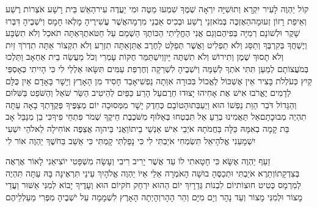 \documentclass[../main/main.tex]{subfiles}
\begin{document}
\begin{multicols*}{\ncols}
קוֹל יַהְוֶה לָעִיר יִקְרָא וְתוּשִׁיָּה יִרְאָה\SubEnd{} שְׁמֶךָ שִׁמְעוּ מַטֶּה וּמִי יַעֲדֶה עִיר\SubEnd{}\PreVerseSpace{}הַאֵשׁ\SubEnd{} בֵּית רָשָׁע אֹצְרוֹת רֶשַׁע וְאֵיפַת רָזוֹן זְעוּמָה\PreVerseSpace{}הַאֶזְכֶּה בְּמֹאזְנֵי רֶשַׁע וּבְכִיס אַבְנֵי מִרְמָה\PreVerseSpace{}אֲשֶׁר עֲשִׁירֶיהָ מָלְאוּ חָמָס וְיֹשְׁבֶיהָ דִּבְּרוּ שָׁקֶר וּלְשׁוֹנָם רְמִיָּה בְּפִיהֶם\PreVerseSpace{}וְגַם אֲנִי הֶחֱלֵיתִי הַכּוֹתֶךָ הַשְׁמֵם עַל חַטֹּאתֶךָ\PreVerseSpace{}אַתָּה תֹאכַל וְלֹא תִשְׂבָּע וְיֶשְׁחֲךָ בְּקִרְבֶּךָ וְתַסֵּג וְלֹא תַפְלִיט וַאֲשֶׁר תְּפַלֵּט לַחֶרֶב אֶתֵּן\PreVerseSpace{}אַתָּה תִזְרַע וְלֹא תִקְצוֹר אַתָּה תִדְרֹךְ זַיִת וְלֹא תָסוּךְ שֶׁמֶן וְתִירוֹשׁ וְלֹא תִשְׁתֶּה יָּיִן\PreVerseSpace{}וְיִשְׁתַּמֵּר חֻקּוֹת עָמְרִי וְכֹל מַעֲשֵׂה בֵית אַחְאָב וַתֵּלְכוּ בְּמֹעֲצוֹתָם לְמַעַן תִּתִּי אֹתְךָ לְשַׁמָּה וְיֹשְׁבֶיהָ לִשְׁרֵקָה וְחֶרְפַּת עַמִּים\SubEnd{} תִּשָּׂאוּ \ClosedSection{}אַלְלַי לִי כִּי הָיִיתִי כְּאָסְפֵּי קַיִץ כְּעֹלְלֹת בָּצִיר אֵין אֶשְׁכּוֹל לֶאֱכוֹל בִּכּוּרָה אִוְּתָה נַפְשִׁי\PreVerseSpace{}אָבַד חָסִיד מִן הָאָרֶץ וְיָשָׁר בָּאָדָם אָיִן כֻּלָּם לְדָמִים יֶאֱרֹבוּ אִישׁ אֶת אָחִיהוּ יָצוּדוּ חֵרֶם\PreVerseSpace{}עַל הָרַע כַּפַּיִם לְהֵיטִיב הַשַּׂר שֹׁאֵל וְהַשֹּׁפֵט בַּשִּׁלּוּם וְהַגָּדוֹל דֹּבֵר הַוַּת נַפְשׁוֹ הוּא וַיְעַבְּתוּהָ\PreVerseSpace{}טוֹבָם כְּחֵדֶק יָשָׁר מִמְּסוּכָה יוֹם מְצַפֶּיךָ פְּקֻדָּתְךָ בָאָה עַתָּה תִהְיֶה מְבוּכָתָם\PreVerseSpace{}אַל תַּאֲמִינוּ בְרֵעַ אַל תִּבְטְחוּ בְּאַלּוּף מִשֹּׁכֶבֶת חֵיקֶךָ שְׁמֹר פִּתְחֵי פִיךָ\PreVerseSpace{}כִּי בֵן מְנַבֵּל אָב בַּת קָמָה בְאִמָּהּ כַּלָּה בַּחֲמֹתָהּ אֹיְבֵי אִישׁ אַנְשֵׁי בֵיתוֹ\PreVerseSpace{}וַאֲנִי בַּיהוָה אֲצַפֶּה אוֹחִילָה לֵאלֹהֵי יִשְׁעִי יִשְׁמָעֵנִי אֱלֹהָי\PreVerseSpace{}אַל תִּשְׂמְחִי אֹיַבְתִּי לִי כִּי נָפַלְתִּי קָמְתִּי כִּי אֵשֵׁב בַּחֹשֶׁךְ יַהְוֶה אוֹר לִי\OpenSection{}\par
{}זַעַף יַהְוֶה אֶשָּׂא כִּי חָטָאתִי לוֹ עַד אֲשֶׁר יָרִיב רִיבִי וְעָשָׂה מִשְׁפָּטִי יוֹצִיאֵנִי לָאוֹר אֶרְאֶה בְּצִדְקָתוֹ\PreVerseSpace{}וְתֵרֶא אֹיַבְתִּי וּתְכַסֶּהָ בוּשָׁה הָאֹמְרָה אֵלַי אַיּוֹ יַהְוֶה אֱלֹהָיִךְ עֵינַי תִּרְאֶינָּה בָּהּ עַתָּה תִּהְיֶה לְמִרְמָס כְּטִיט חוּצוֹת\PreVerseSpace{}יוֹם לִבְנוֹת גְּדֵרָיִךְ יוֹם הַהוּא יִרְחַק חֹק\PreVerseSpace{}יוֹם הוּא וְעָדֶיךָ יָבוֹא לְמִנִּי אַשּׁוּר וַעֲדֵי\SubEnd{} מָצוֹר וּלְמִנִּי מָצוֹר וְעַד נָהָר וְיָם מִיָּם וְהַר הָהָר\PreVerseSpace{}וְהָיְתָה הָאָרֶץ לִשְׁמָמָה עַל יֹשְׁבֶיהָ מִפְּרִי מַעַלְלֵיהֶם\OpenSection{}\par

\end{multicols*}
\end{document}
